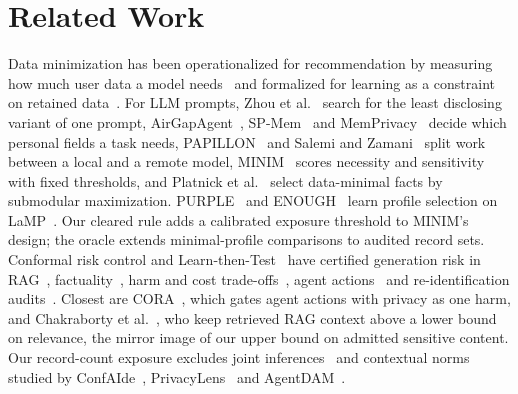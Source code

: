 \section{Related Work}
\label{sec:related}
Data minimization has been operationalized for recommendation by measuring
how much user data a model needs~\cite{biega2020operationalizing} and
formalized for learning as a constraint on retained
data~\cite{ganesh2025data}. For LLM prompts, Zhou et
al.~\cite{zhou2026operationalizing} search for the least disclosing variant of
one prompt, AirGapAgent~\cite{bagdasarian2024airgapagent}, SP-Mem~\cite{wang2026spmem}
and MemPrivacy~\cite{chen2026memprivacy} decide which personal fields a task
needs, PAPILLON~\cite{li2025papillon} and Salemi and
Zamani~\cite{salemi2026improving} split work between a local and a remote
model, MINIM~\cite{yu2026minim} scores necessity and sensitivity with fixed
thresholds, and Platnick et al.~\cite{platnick2025structured} select
data-minimal facts by submodular maximization. PURPLE~\cite{du2026purple} and
ENOUGH~\cite{liu2026enough} learn profile selection on LaMP~\cite{salemi2024lamp}.
Our cleared rule adds a calibrated exposure threshold to MINIM's design;
the oracle extends minimal-profile comparisons to audited record sets.
Conformal risk control and Learn-then-Test~\cite{angelopoulos2024conformal,bates2021distribution,angelopoulos2025learn}
have certified generation risk in RAG~\cite{kang2024crag},
factuality~\cite{mohri2024language,quach2024conformal}, harm and cost
trade-offs~\cite{overman2025conformal,laufer2023pareto}, agent
actions~\cite{feng2026cora,rahman2026beyond} and re-identification
audits~\cite{huang2026conformal}. Closest are CORA~\cite{feng2026cora}, which
gates agent actions with privacy as one harm, and Chakraborty et
al.~\cite{chakraborty2026principled}, who keep retrieved RAG context above a
lower bound on relevance, the mirror image of our upper bound on admitted
sensitive content. Our record-count exposure excludes joint inferences~\cite{staab2024beyond} and contextual norms studied by ConfAIde~\cite{mireshghallah2024confaide},
PrivacyLens~\cite{shao2024privacylens} and AgentDAM~\cite{zharmagambetov2025agentdam}.
